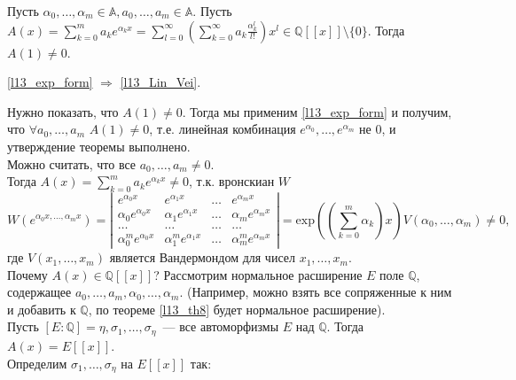 \begin{theorem} \label{l13_exp_form}
	Пусть $\alpha_0, \ldots, \alpha_m \in \mathbb{A}, a_0, \ldots, a_m \in \mathbb{A}$. Пусть $\displaystyle A(x) = \sum_{k = 0}^{m} a_k e^{\alpha_k x} = \sum_{l = 0}^{\infty} \left( \sum_{k = 0}^{\infty} a_k \frac{\alpha_k^l}{l!} \right)x^l \in \mathbb{Q}[[x]] \setminus \lbrace 0 \rbrace$.
	Тогда $A(1) \ne 0$.
\end{theorem}

\begin{theorem} \label{l13_th10}
	\ref{l13_exp_form} $\Rightarrow$ \ref{l13_Lin_Vei}.
\end{theorem}
\begin{pf}
	Нужно показать, что $A(1) \ne 0$. Тогда мы применим \ref{l13_exp_form} и получим, что $\forall a_0, \ldots, a_m$ $A(1) \ne 0$, т.е. линейная комбинация $e^{\alpha_0}, \ldots, e^{\alpha_m}$ не 0, и утверждение теоремы выполнено.\\
	Можно считать, что все $a_0, \ldots, a_m \ne 0$.\\
	Тогда $\displaystyle A(x) = \sum_{k = 0}^{m} a_k e^{\alpha_k x} \ne 0$, т.к. вронскиан $W$\\
	\[ W(e^{\alpha_0 x, \ldots, \alpha_m x}) = \left|
	\begin{array}{cccc}
		e^{\alpha_0 x}       & e^{\alpha_1 x}   & \ldots & e^{\alpha_m x}  \\
	\alpha_0 e^{\alpha_0 x}       & \alpha_1 e^{\alpha_1 x}   & \ldots & \alpha_m e^{\alpha_m x} \\
	\ldots & \ldots & \ldots & \ldots \\
	\alpha_0^m e^{\alpha_0 x}       & \alpha_1^m e^{\alpha_1 x}   & \ldots & \alpha_m^m e^{\alpha_m x}
    \end{array} \right|  = \mathrm{exp}\left(\left(\sum_{k=0}^{m} \alpha_k\right)x\right)  V(\alpha_0, \ldots, \alpha_m) \ne 0,\]
    где $V(x_1, \ldots, x_m)$ является Вандермондом для чисел $x_1, \ldots, x_m$.\\
    Почему $A(x) \in \mathbb{Q}[[x]]$? Рассмотрим нормальное расширение $E$ поле $\mathbb{Q}$, содержащее $a_0, \ldots, a_m, \alpha_0, \ldots, \alpha_m$. (Например, можно взять все сопряженные к ним и добавить к $\mathbb{Q}$, по теореме \ref{l13_th8} будет нормальное расширение).\\
    Пусть $[E : \mathbb{Q}] = \eta, \sigma_1, \ldots, \sigma_{\eta}$ — все автоморфизмы $E$ над $\mathbb{Q}$. Тогда $A(x) = E[[x]]$.\\
    Определим $\sigma_1, \ldots, \sigma_{\eta}$ на $E[[x]]$ так:

\end{pf}
